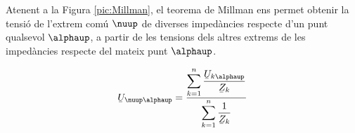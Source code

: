 Atenent a la Figura \vref{pic:Millman}, el teorema
de Millman ens permet
obtenir la tensi\'{o} de l'extrem com\'{u} $\nuup$ de diverses imped\`{a}ncies respecte d'un punt
qualsevol $\alphaup$, a partir de les tensions dels altres extrems de les imped\`{a}ncies respecte
 del mateix punt $\alphaup$.

\hfill
\begin{minipage}[b]{7cm}
    
    \label{pic:Millman}
\end{minipage}
\hfill
\begin{minipage}[b][4.5cm][t]{6cm}
    \begin{equation}
        \cmplx{U}_{\nuup\alphaup} = \frac{\displaystyle\sum_{k=1}^n \dfrac{\cmplx{U}_{k\alphaup}}{\cmplx{Z}_k}} {\displaystyle\sum_{k=1}^n \dfrac{1}{\cmplx{Z}_k}}
    \end{equation}
\end{minipage}


\pagebreak

